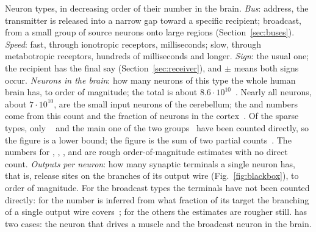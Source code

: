 \begin{table}[t]
\caption{Neuron types, in decreasing order of their number in the brain. \emph{Bus}: address, the transmitter is released into a narrow gap toward a specific recipient; broadcast, from a small group of source neurons onto large regions (Section~\ref{sec:buses}). \emph{Speed}: fast, through ionotropic receptors, milliseconds; slow, through metabotropic receptors, hundreds of milliseconds and longer. \emph{Sign}: the usual one; the recipient has the final say (Section~\ref{sec:receiver}), and $\pm$ means both signs occur. \emph{Neurons in the brain}: how many neurons of this type the whole human brain has, to order of magnitude; the total is about $8.6\cdot10^{10}$~\cite{Azevedo2009}. Nearly all  neurons, about $7\cdot10^{10}$, are the small input neurons of the cerebellum; the  and  numbers come from this count and the fraction of  neurons in the cortex~\cite{Hendry1987}. Of the sparse types, only ~\cite{Airaksinen1991} and the main one of the two  groups~\cite{Pakkenberg1991} have been counted directly, so the  figure is a lower bound; the  figure is the sum of two partial counts~\cite{Baker1990,Baker1991}. The numbers for , , , and  are rough order-of-magnitude estimates with no direct count. \emph{Outputs per neuron}: how many synaptic terminals a single neuron has, that is, release sites on the branches of its output wire (Fig.~\ref{fig:blackbox}), to order of magnitude. For the broadcast types the terminals have not been counted directly: for  the number is inferred from what fraction of its target the branching of a single output wire covers~\cite{Matsuda2009}; for the others the estimates are rougher still.  has two cases: the neuron that drives a muscle and the broadcast neuron in the brain.}
\label{tab:types}
\end{table}


